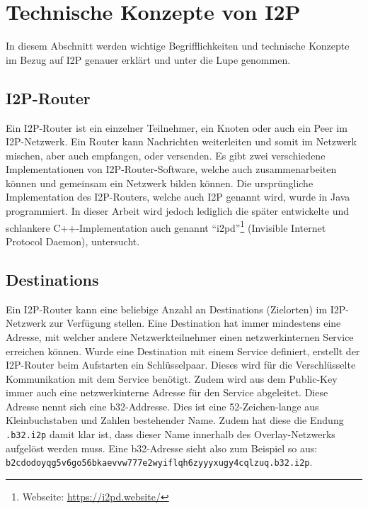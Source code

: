\section{Technische Konzepte von I2P}
\label{sec:technischeKonzepte}

In diesem Abschnitt werden wichtige Begrifflichkeiten und technische Konzepte im Bezug auf I2P genauer erklärt und unter die Lupe genommen.

\subsection{I2P-Router}\label{sec:router}

Ein I2P-Router ist ein einzelner Teilnehmer, ein Knoten oder auch ein Peer im I2P-Netzwerk.
Ein Router kann Nachrichten weiterleiten und somit im Netzwerk mischen, aber auch empfangen, oder versenden.
Es gibt zwei verschiedene Implementationen von I2P-Router-Software, welche auch zusammenarbeiten können und gemeinsam ein Netzwerk bilden können.
Die ursprüngliche Implementation des I2P-Routers, welche auch I2P genannt wird, wurde in Java programmiert.
In dieser Arbeit wird jedoch lediglich die später entwickelte und schlankere C++-Implementation auch genannt ``i2pd''\footnote{Webseite: \url{https://i2pd.website/}} (Invisible Internet Protocol Daemon), untersucht.

\subsection{Destinations}

Ein I2P-Router kann eine beliebige Anzahl an Destinations (Zielorten) im I2P-Netzwerk zur Verfügung stellen.
Eine Destination hat immer mindestens eine Adresse, mit welcher andere Netzwerkteilnehmer einen netzwerkinternen Service erreichen können.
Wurde eine Destination mit einem Service definiert, erstellt der I2P-Router beim Aufstarten ein Schlüsselpaar.
Dieses wird für die Verschlüsselte Kommunikation mit dem Service benötigt.
Zudem wird aus dem Public-Key immer auch eine netzwerkinterne Adresse für den Service abgeleitet.
Diese Adresse nennt sich eine b32-Addresse.
Dies ist eine 52-Zeichen-lange aus Kleinbuchstaben und Zahlen bestehender Name.
Zudem hat diese die Endung \lstinline|.b32.i2p| damit klar ist, dass dieser Name innerhalb des Overlay-Netzwerks aufgelöst werden muss.
Eine b32-Adresse sieht also zum Beispiel so aus:\\
\lstinline|b2cdodoyqg5v6go56bkaevvw777e2wyiflqh6zyyyxugy4cqlzuq.b32.i2p|.
\parencite{noauthor_naming_nodate}

